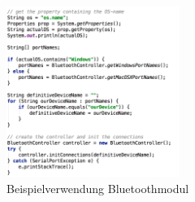  \begin{figure}[h!]                 
	\includegraphics[width=0.5\textwidth]{../fig/Beispielverwendung Bluetoothmodul.png}
	\caption{Beispielverwendung Bluetoothmodul}
	\label{fig:Beispielverwendung Bluetoothmodul}        
\end{figure}


